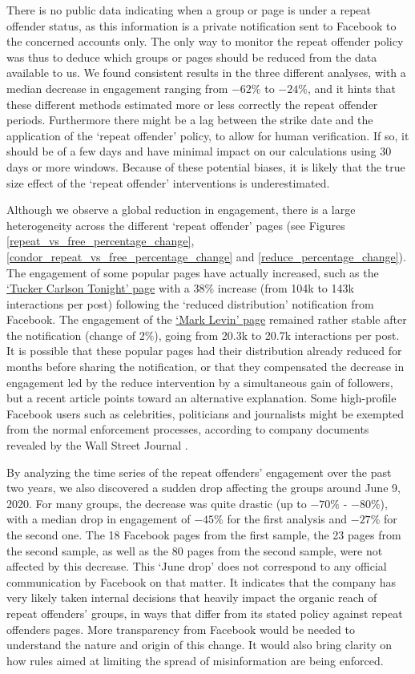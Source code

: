 \documentclass[review]{elsarticle}
\begin{document}
{There is no public data indicating when a group or page is under a repeat offender status, as this information is a private notification sent to Facebook to the concerned accounts only.
The only way to monitor the repeat offender policy was thus to deduce which groups or pages should be reduced from the data available to us.
We found consistent results in the three different analyses, with a median decrease in engagement ranging from $-62\%$ to $-24\%$, and it hints that these different methods estimated more or less correctly the repeat offender periods.
Furthermore there might be a lag between the strike date and the application of the `repeat offender' policy, to allow for human verification. 
If so, it should be of a few days and have minimal impact on our calculations using 30 days or more windows.
Because of these potential biases, it is likely that the true size effect of the `repeat offender' interventions is underestimated.

Although we observe a global reduction in engagement, there is a large heterogeneity across the different `repeat offender' pages (see Figures \ref{repeat_vs_free_percentage_change}, \ref{condor_repeat_vs_free_percentage_change} and \ref{reduce_percentage_change}). 
The engagement of some popular pages have actually increased, such as the \href{https://www.facebook.com/TuckerCarlsonTonight/}{`Tucker Carlson Tonight' page} with a $38\%$ increase (from 104k to 143k interactions per post) following the `reduced distribution' notification from Facebook.
The engagement of the \href{https://www.facebook.com/marklevinshow}{`Mark Levin' page} remained rather stable after the notification (change of $2\%$), going from 20.3k to 20.7k interactions per post.
It is possible that these popular pages had their distribution already reduced for months before sharing the notification, or that they compensated the decrease in engagement led by the reduce intervention by a simultaneous gain of followers, but a recent article points toward an alternative explanation.
Some high-profile Facebook users such as celebrities, politicians and journalists might be exempted from the normal enforcement processes, according to company documents revealed by the Wall Street Journal \citep{WSJrevelations}.

By analyzing the time series of the repeat offenders’ engagement over the past two years, we also discovered a sudden drop affecting the groups around June 9, 2020.
For many groups, the decrease was quite drastic (up to $-70\%$ - $-80\%$), with a median drop in engagement of $-45\%$ for the first analysis and $-27\%$ for the second one.
The 18 Facebook pages from the first sample, the 23 pages from the second sample, as well as the 80 pages from the second sample, were not affected by this decrease.
This `June drop' does not correspond to any official communication by Facebook on that matter. 
It indicates that the company has very likely taken internal decisions that heavily impact the organic reach of repeat offenders' groups, in ways that differ from its stated policy against repeat offenders pages.
More transparency from Facebook would be needed to understand the nature and origin of this change. 
It would also bring clarity on how rules aimed at limiting the spread of misinformation are being enforced.

}
\end{document}
